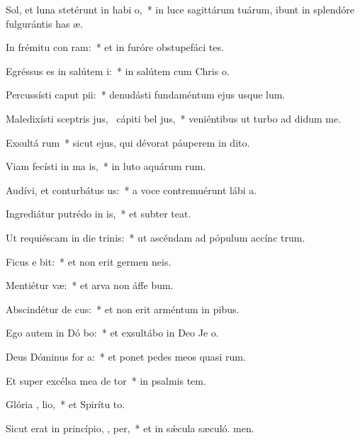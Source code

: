 \item Sol, et luna stetérunt in habi o,~* in luce sagittárum tuárum, ibunt in splendóre fulgurántis has æ.
\item In frémitu con ram:~* et in furóre obstupefáci tes.
\item Egréssus es in salútem  i:~* in salútem cum Chris o.
\item Percussísti caput   pii:~* denudásti fundaméntum ejus usque  lum.
\item Maledixísti sceptris jus,~\pscross{} cápiti bel jus,~* veniéntibus ut turbo ad didum me.
\item Exsultá rum~* sicut ejus, qui dévorat páuperem in dito.
\item Viam fecísti in ma  is,~* in luto aquárum rum.
\item Audívi, et conturbátus   us:~* a voce contremuérunt lábi a.
\item Ingrediátur putrédo in  is,~* et subter  teat.
\item Ut requiéscam in die trinis:~* ut ascéndam ad pópulum accínc trum.
\item Ficus e  bit:~* et non erit germen  neis.
\item Mentiétur  væ:~* et arva non áffe bum.
\item Abscindétur de  cus:~* et non erit arméntum in pibus.
\item Ego autem in Dó bo:~* et exsultábo in Deo Je o.
\item Deus Dóminus for a:~* et ponet pedes meos quasi rum.
\item Et super excélsa mea de  tor~* in psalmis tem.
\item Glória ,  lio,~* et Spirítu to.
\item Sicut erat in princípio,  ,  per,~* et in sǽcula sæculó. men.
